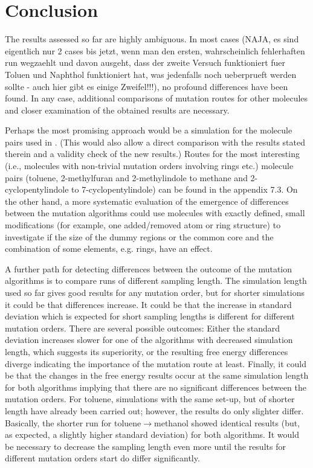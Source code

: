\chapter{Conclusion}

The results assessed so far are highly ambiguous. In most cases {\color{red} (NAJA, es sind eigentlich nur 2 cases bis jetzt, wenn man den ersten, wahrscheinlich fehlerhaften run wegzaehlt und davon ausgeht, dass der zweite Versuch funktioniert fuer Toluen und Naphthol funktioniert hat, was jedenfalls noch ueberprueft werden sollte - auch hier gibt es einige Zweifel!!!)}, no profound differences have been found. In any case, additional comparisons of mutation routes for other molecules and closer examination of the obtained results are necessary.

Perhaps the most promising approach would be a simulation for the molecule pairs used in \cite{Loeffler.2018, Wieder.2022}. (This would also allow a direct comparison with the results stated therein and a validity check of the new results.) Routes for the most interesting (i.e., molecules with non-trivial mutation orders involving rings etc.) molecule pairs (toluene, 2-methylfuran and 2-methylindole to methane and 2-cyclopentylindole to 7-cyclopentylindole) can be found in the appendix 7.3. 
On the other hand, a more systematic evaluation of the emergence of differences between the mutation algorithms could use molecules with exactly defined, small modifications (for example, one added/removed atom or ring structure) to investigate if the size of the dummy regions or the common core and the combination of some elements, e.g. rings, have an effect.


A further path for detecting differences between the outcome of the mutation algorithms is to compare runs of different sampling length. The simulation length used so far gives good results for any mutation order, but for shorter simulations it could be that differences increase. It could be that the increase in standard deviation which is expected for short sampling lengths is different for different mutation orders. There are several possible outcomes: Either the standard deviation increases slower for one of the algorithms with decreased simulation length, which suggests its superiority, or the resulting free energy differences diverge indicating the importance of the mutation route at least. Finally, it could be that the changes in the free energy results occur at the same simulation length for both algorithms implying that there are no significant differences between the mutation orders.
For toluene, simulations with the same set-up, but of shorter length have already been carried out; however, the results do only slighter differ. Basically, the shorter run for toluene$ 	\rightarrow $methanol showed identical results (but, as expected, a slightly higher standard deviation) for both algorithms. It would be necessary to decrease the sampling length even more until the results for different mutation orders start do differ significantly.

